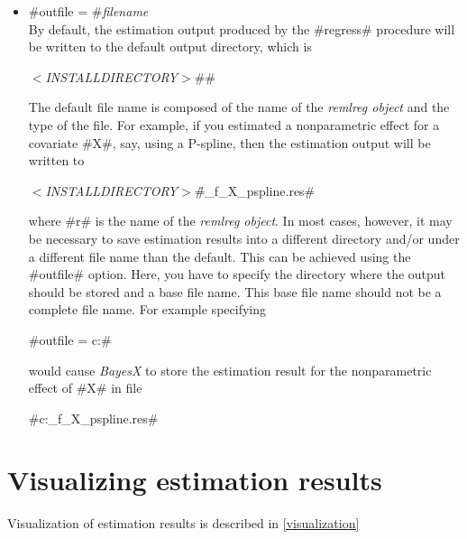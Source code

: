 \begin{itemize}
\item #outfile = #{\em filename} \\
By default, the estimation output produced by the #regress#
procedure will be written to the default output directory, which
is

{\em$<$INSTALLDIRECTORY$>$}#\output#

The default file name is composed of the name of the {\em remlreg
object} and the type of the file. For example, if you estimated a
nonparametric effect for a covariate #X#, say, using a P-spline,
then the estimation output will be written to

{\em$<$INSTALLDIRECTORY$>$}#\output\r_f_X_pspline.res#

where #r# is the name of the {\em remlreg object}. In most cases,
however, it may be necessary to save estimation results into a
different directory and/or under a different file name than the
default. This can be achieved using the #outfile# option. Here, you
have to specify the directory where the output should be stored and
a base file name. This base file name should not be a complete file
name. For example specifying

#outfile = c:\data{}#

would cause {\em BayesX} to store the estimation result for the
nonparametric effect of #X# in file

#c:\data{}_f_X_pspline.res#
\end{itemize}

\section{Visualizing estimation results}

Visualization of estimation results is described in
\autoref{visualization}

